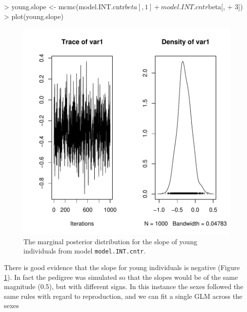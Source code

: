 \documentclass{article}
\begin{document}
\begin{Schunk}
\begin{Sinput}
> young.slope <- mcmc(model.INT.cntr$beta[, 1] + model.INT.cntr$beta[, 
+     3])
> plot(young.slope)
\end{Sinput}
\end{Schunk}


\begin{figure}[!h]
\begin{center}
\includegraphics{Tutorial-063}
\end{center}
\caption{The marginal posterior distribution for the slope of young individuals from model \texttt{model.INT.cntr}.}
\label{ys-fig}
\end{figure}

There is good evidence that the slope for young individuals is negative (Figure \ref{ys-fig}).  In fact the pedigree was simulated so that the slopes would be of the same magnitude (0.5), but with different signs. In this instance the sexes followed the same rules with regard to reproduction, and we can fit a single GLM across the sexes
\end{document}
